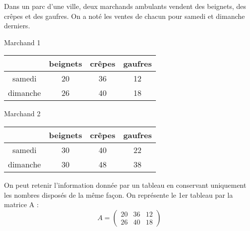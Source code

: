 \documentclass[a4paper,10pt]{article}
\begin{document}
	
	
\exo{}

Dans un parc d’une ville, deux marchands ambulants vendent des beignets,
des crêpes et des gaufres. On a noté les ventes de chacun pour samedi et dimanche derniers.

\begin{multicols}{2}
\begin{center}
Marchand 1\\[1em]

\begin{tabular}{|c|c|c|c|}
\hline
 & beignets & crêpes & gaufres \\
\hline
samedi & 20 & 36 & 12 \\
\hline
dimanche & 26 & 40 & 18 \\
\hline
\end{tabular}
\columnbreak


Marchand 2\\[1em]

\begin{tabular}{|c|c|c|c|}
\hline
 & beignets & crêpes & gaufres \\
\hline
samedi & 30 & 40 & 22 \\
\hline
dimanche & 30 & 48 & 38 \\
\hline
\end{tabular}
\end{center}
\end{multicols}

On peut retenir l’information donnée par un tableau en conservant uniquement les
nombres disposés de la même façon. On représente le 1er tableau par la matrice A :
$$A=\begin{pmatrix}
20&36&12\\
26&40&18
\end{pmatrix}$$
\end{document}
